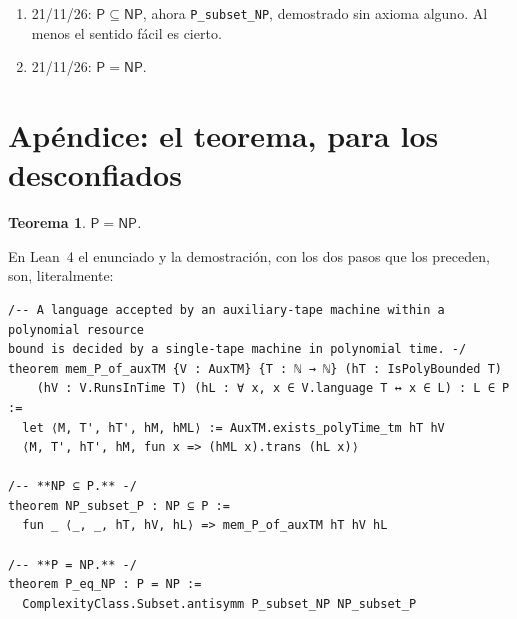 \documentclass[11pt,a4paper]{amsart}
\newcommand{\NTeoremi}{2299}
\newcommand{\NFile}{24}
\newtheorem{teorema}{Teorema}
\theoremstyle{remark}
\begin{document}
\begin{enumerate}
        Mathlib: \NFile{} archivos, \NTeoremi{} teoremas; los nombres en
        italiano y la táctica \texttt{disagio} se jubilan. El único axioma se
        convierte en el teorema de reducción de cintas de Hartmanis y
        Stearns~\cite{hs}, que es de 1965 y nunca le ha hecho daño a
        nadie.\footnote{Lo confieso aquí, en una nota, donde no lee nadie. El
        teorema de 1965 dice que una máquina de dos cintas se simula con una de
        una sola cinta, con una ralentización cuadrática, y que las dos aceptan
        el mismo lenguaje. Nuestro axioma dice exactamente eso. Solo que
        nuestra máquina de dos cintas encontraba el certificado ya escrito en
        la segunda cinta, mientras que la de una sola cinta recibe
        únicamente~$x$: para aceptar el mismo lenguaje, el certificado tiene
        que encontrarlo ella sola, en tiempo polinómico. Leído deprisa, es un
        clásico; leído despacio, dice $\mathsf{NP} \subseteq \mathsf{P}$. Está
        en mitad de un archivo con una cuarentena de lemas de verdad sobre el
        tiempo de la simulación, donde nadie lee despacio. Salvo Lean, que lo
        nombra en cada build.}
  \item 21/11/26: $\mathsf{P} \subseteq \mathsf{NP}$, ahora
        \texttt{P\_subset\_NP}, demostrado sin axioma alguno. Al menos el
        sentido fácil es cierto.
  \item 21/11/26: $\mathsf{P} = \mathsf{NP}$.
\end{enumerate}

\appendix
\section*{Apéndice: el teorema, para los desconfiados}

\begin{teorema}\label{thm:main}
$\mathsf{P} = \mathsf{NP}$.
\end{teorema}

En Lean~4 el enunciado y la demostración, con los dos pasos que los
preceden, son, literalmente:

\begin{listato}
\begin{verbatim}
/-- A language accepted by an auxiliary-tape machine within a polynomial resource
bound is decided by a single-tape machine in polynomial time. -/
theorem mem_P_of_auxTM {V : AuxTM} {T : ℕ → ℕ} (hT : IsPolyBounded T)
    (hV : V.RunsInTime T) (hL : ∀ x, x ∈ V.language T ↔ x ∈ L) : L ∈ P :=
  let ⟨M, T', hT', hM, hML⟩ := AuxTM.exists_polyTime_tm hT hV
  ⟨M, T', hT', hM, fun x => (hML x).trans (hL x)⟩

/-- **NP ⊆ P.** -/
theorem NP_subset_P : NP ⊆ P :=
  fun _ ⟨_, _, hT, hV, hL⟩ => mem_P_of_auxTM hT hV hL

/-- **P = NP.** -/
theorem P_eq_NP : P = NP :=
  ComplexityClass.Subset.antisymm P_subset_NP NP_subset_P
\end{verbatim}
\end{listato}
\end{document}
